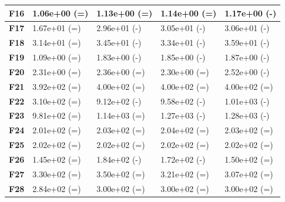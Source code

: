 \documentclass[12pt,a4paper]{report}
\begin{document}
{{{{{{{\begin{table}[h]
\begin{tabular}{|l|l|l|l|l|}
{\bf F16} & 1.06e+00 (=)        & 1.13e+00 (=)    & 1.14e+00 (=)     & 1.17e+00 (-)     \\ \hline
{\bf F17} & 1.67e+01 (=)        & 2.96e+01 (-)    & 3.05e+01 (-)     & 3.06e+01 (-)     \\ \hline
{\bf F18} & 3.14e+01 (=)        & 3.45e+01 (-)    & 3.34e+01 (-)     & 3.59e+01 (-)     \\ \hline
{\bf F19} & 1.09e+00 (=)        & 1.83e+00 (-)    & 1.85e+00 (-)     & 1.87e+00 (-)     \\ \hline
{\bf F20} & 2.31e+00 (=)        & 2.36e+00 (=)    & 2.30e+00 (=)     & 2.52e+00 (-)     \\ \hline
{\bf F21} & 3.92e+02 (=)        & 4.00e+02 (=)    & 4.00e+02 (=)     & 4.00e+02 (=)     \\ \hline
{\bf F22} & 3.10e+02 (=)        & 9.12e+02 (-)    & 9.58e+02 (-)     & 1.01e+03 (-)     \\ \hline
{\bf F23} & 9.81e+02 (=)        & 1.14e+03 (=)    & 1.27e+03 (-)     & 1.28e+03 (-)     \\ \hline
{\bf F24} & 2.01e+02 (=)        & 2.03e+02 (=)    & 2.04e+02 (=)     & 2.03e+02 (=)     \\ \hline
{\bf F25} & 2.02e+02 (=)        & 2.02e+02 (=)    & 2.02e+02 (=)     & 2.02e+02 (=)     \\ \hline
{\bf F26} & 1.45e+02 (=)        & 1.84e+02 (-)    & 1.72e+02 (-)     & 1.50e+02 (=)     \\ \hline
{\bf F27} & 3.30e+02 (=)        & 3.50e+02 (=)    & 3.21e+02 (=)     & 3.07e+02 (=)     \\ \hline
{\bf F28} & 2.84e+02 (=)        & 3.00e+02 (=)    & 3.00e+02 (=)     & 3.00e+02 (=)     \\ \hline
\end{tabular}
\end{table}

}}}}}}}
\end{document}
